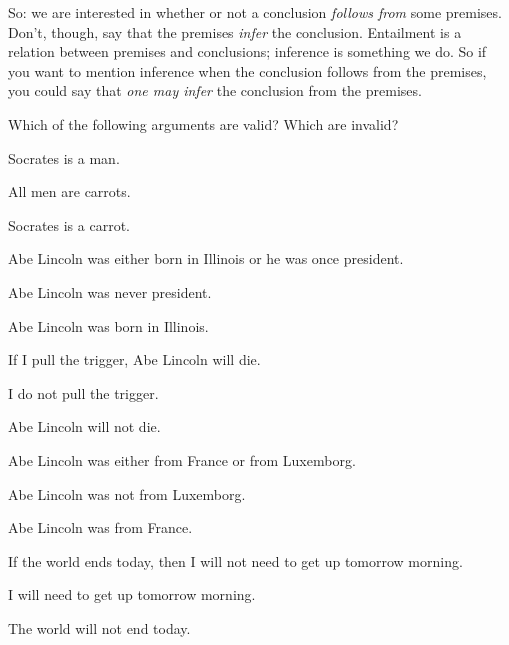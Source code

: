 So: we are interested in whether or not a conclusion \emph{follows from} some premises. Don't, though, say that the premises \emph{infer} the conclusion. Entailment is a relation between premises and conclusions; inference is something we do. So if you want to mention inference when the conclusion follows from the premises, you could say that \emph{one may infer} the conclusion from the premises.


\practiceproblems
\problempart
Which of the following arguments are valid? Which are invalid?

\begin{earg}
\item Socrates is a man.
\item All men are carrots.
\item[\therefore] Socrates is a carrot.
\end{earg}

\begin{earg}
\item Abe Lincoln was either born in Illinois or he was once president.
\item Abe Lincoln was never president.
\item[\therefore] Abe Lincoln was born in Illinois.
\end{earg}

\begin{earg}
\item If I pull the trigger, Abe Lincoln will die.
\item I do not pull the trigger.
\item[\therefore] Abe Lincoln will not die.
\end{earg}

\begin{earg}
\item Abe Lincoln was either from France or from Luxemborg.
\item Abe Lincoln was not from Luxemborg.
\item[\therefore] Abe Lincoln was from France.
\end{earg}

\begin{earg}
\item If the world ends today, then I will not need to get up tomorrow morning.
\item I will need to get up tomorrow morning.
\item[\therefore] The world will not end today.
\end{earg}

